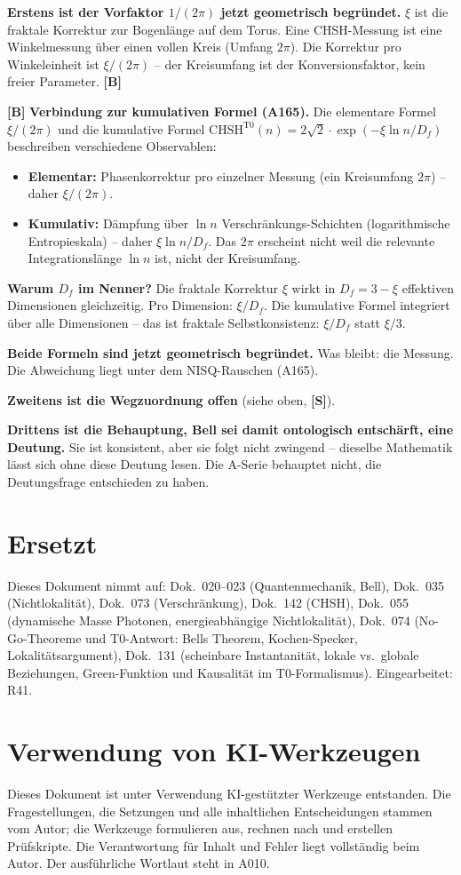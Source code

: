 \textbf{Erstens ist der Vorfaktor $1/(2\pi)$ jetzt geometrisch begründet.}
$\xi$ ist die fraktale Korrektur zur Bogenlänge auf dem Torus. Eine CHSH-Messung
ist eine Winkelmessung über einen vollen Kreis (Umfang $2\pi$). Die Korrektur
pro Winkeleinheit ist $\xi/(2\pi)$ -- der Kreisumfang ist der Konversionsfaktor,
kein freier Parameter. \textbf{[B]}

\textbf{[B]} \textbf{Verbindung zur kumulativen Formel (A165).}
Die elementare Formel $\xi/(2\pi)$ und die kumulative Formel
$\text{CHSH}^{\text{T0}}(n)=2\sqrt2\cdot\exp(-\xi\ln n/D_f)$
beschreiben verschiedene Observablen:
\begin{itemize}[leftmargin=2em,itemsep=1pt,topsep=2pt]
  \item \textbf{Elementar:} Phasenkorrektur pro einzelner Messung (ein Kreisumfang
    $2\pi$) -- daher $\xi/(2\pi)$.
  \item \textbf{Kumulativ:} Dämpfung über $\ln n$ Verschränkungs-Schichten
    (logarithmische Entropieskala) -- daher $\xi\ln n/D_f$.
    Das $2\pi$ erscheint nicht weil die relevante Integrationslänge $\ln n$
    ist, nicht der Kreisumfang.
\end{itemize}
\textbf{Warum $D_f$ im Nenner?} Die fraktale Korrektur $\xi$ wirkt in
$D_f=3-\xi$ effektiven Dimensionen gleichzeitig. Pro Dimension: $\xi/D_f$.
Die kumulative Formel integriert über alle Dimensionen -- das ist fraktale
Selbstkonsistenz: $\xi/D_f$ statt $\xi/3$.

\textbf{Beide Formeln sind jetzt geometrisch begründet.} Was bleibt: die
Messung. Die Abweichung liegt unter dem NISQ-Rauschen (A165).

\textbf{Zweitens ist die Wegzuordnung offen} (siehe oben, \textbf{[S]}).

\textbf{Drittens ist die Behauptung, Bell sei damit ontologisch entschärft, eine
Deutung.} Sie ist konsistent, aber sie folgt nicht zwingend -- dieselbe
Mathematik lässt sich ohne diese Deutung lesen. Die A-Serie behauptet nicht, die
Deutungsfrage entschieden zu haben.

\section{Ersetzt}

Dieses Dokument nimmt auf: Dok.~020--023 (Quantenmechanik, Bell), Dok.~035
(Nichtlokalität), Dok.~073 (Verschränkung), Dok.~142 (CHSH), Dok.~055
(dynamische Masse Photonen, energieabhängige Nichtlokalität), Dok.~074
(No-Go-Theoreme und T0-Antwort: Bells Theorem, Kochen-Specker, Lokalitätsargument),
Dok.~131 (scheinbare Instantanität, lokale vs.\ globale Beziehungen, Green-Funktion
und Kausalität im T0-Formalismus). Eingearbeitet: R41.

\section{Verwendung von KI-Werkzeugen}

Dieses Dokument ist unter Verwendung KI-gestützter Werkzeuge entstanden. Die
Fragestellungen, die Setzungen und alle inhaltlichen Entscheidungen stammen vom
Autor; die Werkzeuge formulieren aus, rechnen nach und erstellen Prüfskripte.
Die Verantwortung für Inhalt und Fehler liegt vollständig beim Autor. Der
ausführliche Wortlaut steht in A010.
